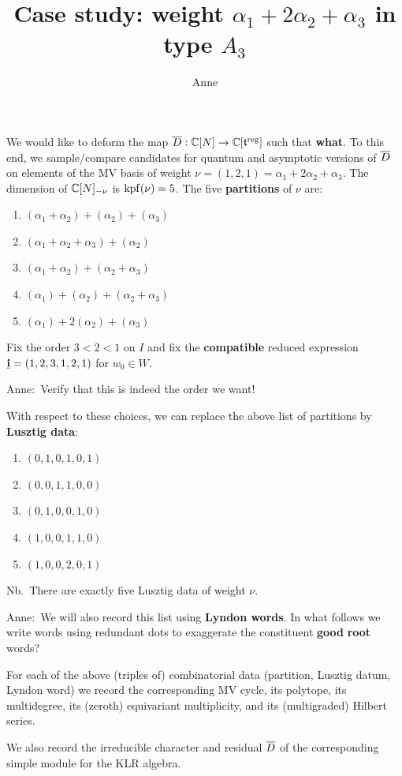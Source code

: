 \documentclass[11pt]{article}
\title{Case study: weight $\alpha_1 + 2\alpha_2 + \alpha_3$ in type $A_3$}
\author{Anne}
\newcommand{\anne}[1]{{\color{pink!50!blue}Anne:~#1}}
\newcommand{\todo}[1]{{\color{red!50!white}\textbf{#1}}} %
\begin{document}
\maketitle
%
We would like to deform the map $\overline{D} : \mathbb C[N]\to \mathbb C[{\mathfrak t}^{\rm reg}]$ such that \todo{what}. 
To this end, we sample/compare candidates for quantum and asymptotic versions of $\overline{D}$ on elements of the MV basis of weight $\nu = (1,2,1) = \alpha_1 + 2\alpha_2 + \alpha_3$. The dimension of $\mathbb C[N]_{-\nu}$ is $\operatorname{kpf}(\nu) = 5$. The five \todo{partitions} of $\nu$ are:
\begin{enumerate}
    \item $(\alpha_1 + \alpha_2) + (\alpha_2) + (\alpha_3)$
    \item $(\alpha_1 + \alpha_2 + \alpha_3) + (\alpha_2)$
    \item $(\alpha_1 + \alpha_2) + (\alpha_2 + \alpha_3)$
    \item $(\alpha_1) + (\alpha_2) + (\alpha_2 + \alpha_3)$
    \item $(\alpha_1) + 2(\alpha_2) + (\alpha_3)$
\end{enumerate}
% 
Fix the order $3 < 2 < 1$ on $I$ and fix the \todo{compatible} reduced expression $\underline{\mathbf{i}} = (1,2,3,1,2,1)$ for $w_0\in W$. 

\anne{Verify that this is indeed the order we want!} 

With respect to these choices, we can replace the above list of partitions by \todo{Lusztig data}:  
\begin{enumerate}
    \item $(0,1,0,1,0,1)$
    \item $(0,0,1,1,0,0)$
    \item $(0,1,0,0,1,0)$
    \item $(1,0,0,1,1,0)$
    \item $(1,0,0,2,0,1)$
\end{enumerate}
Nb.\ There are exactly five Lusztig data of weight $\nu$.

\anne{We will also record this list using \todo{Lyndon words}. In what follows we write words using redundant dots to exaggerate the constituent \todo{good} \todo{root} words?}

For each of the above (triples of) combinatorial data (partition, Lusztig datum, Lyndon word) we record the corresponding MV cycle, its polytope, its multidegree, its (zeroth) equivariant multiplicity, and its (multigraded) Hilbert series. 

We also record the irreducible character and residual $\overline{D}$ of the corresponding simple module for the KLR algebra. 
\end{document}
